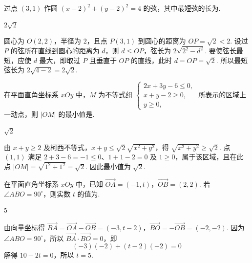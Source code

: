 \begin{problem}
过点 \((3,1)\) 作圆 \( (x-2)^{2}+(y-2)^{2}=4 \) 的弦，其中最短弦的长为\fillinblank{}.
\end{problem}

\begin{answer}
\(2\sqrt{2}\)
\end{answer}

\begin{solution}
圆心为 \(O(2,2)\)，半径为 \(2\)，且点 \(P(3,1)\) 到圆心的距离为 \(OP=\sqrt{2}<2\). 设过 \(P\) 的弦所在直线到圆心的距离为 \(d\)，则 \(d\leqslant OP\)，弦长为 \(2\sqrt{2^2-d^2}\). 要使弦长最短，应使 \(d\) 最大，即取过 \(P\) 且垂直于 \(OP\) 的直线，此时 \(d=OP=\sqrt{2}\). 所以最短弦长为 \(2\sqrt{4-2}=2\sqrt{2}\).
\end{solution}

\begin{problem}
在平面直角坐标系 \(xOy\) 中，\(M\) 为不等式组 \(\begin{cases}
2x + 3y - 6 \leqslant 0,\\
x + y - 2 \geqslant 0,\\
y \geqslant 0,
\end{cases}\) 所表示的区域上一动点，则 \(|OM|\) 的最小值是\fillinblank{}.
\end{problem}

\begin{answer}
\(\sqrt{2}\)
\end{answer}

\begin{solution}
由 \(x+y\geqslant2\) 及柯西不等式，\(x+y\leqslant\sqrt{2}\sqrt{x^2+y^2}\)，得 \(\sqrt{x^2+y^2}\geqslant\sqrt{2}\). 点 \((1,1)\) 满足 \(2+3-6=-1\leqslant0\)、\(1+1-2=0\) 及 \(1\geqslant0\)，属于该区域，且在此点 \(|OM|=\sqrt{1^2+1^2}=\sqrt{2}\). 因此最小值为 \(\sqrt{2}\).
\end{solution}

\begin{problem}
在平面直角坐标系 \(xOy\) 中，已知 \(\overrightarrow{OA} = (-1, t)\)，\(\overrightarrow{OB} = (2, 2)\). 若 \(\angle ABO = 90^\circ\)，则实数 \(t\) 的值为\fillinblank{}.
\end{problem}

\begin{answer}
5
\end{answer}

\begin{solution}
由向量坐标得 \(\overrightarrow{BA}=\overrightarrow{OA}-\overrightarrow{OB}=(-3,t-2)\)，\(\overrightarrow{BO}=-\overrightarrow{OB}=(-2,-2)\). 因为 \(\angle ABO=90^\circ\)，所以 \(\overrightarrow{BA}\cdot\overrightarrow{BO}=0\)，即
\[
(-3)(-2)+(t-2)(-2)=0
\]
解得 \(10-2t=0\)，所以 \(t=5\).
\end{solution}

